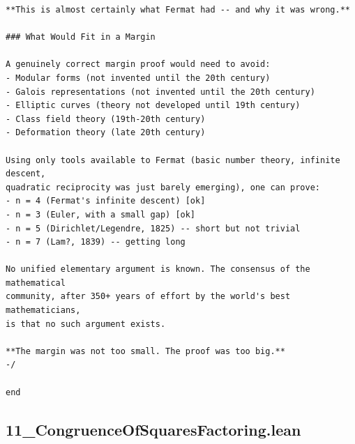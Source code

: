 \documentclass[11pt,openright,twoside]{book}
\theoremstyle{definition}
\begin{document}
\begin{lstlisting}[style=lean]
**This is almost certainly what Fermat had -- and why it was wrong.**

### What Would Fit in a Margin

A genuinely correct margin proof would need to avoid:
- Modular forms (not invented until the 20th century)
- Galois representations (not invented until the 20th century)
- Elliptic curves (theory not developed until 19th century)
- Class field theory (19th-20th century)
- Deformation theory (late 20th century)

Using only tools available to Fermat (basic number theory, infinite descent,
quadratic reciprocity was just barely emerging), one can prove:
- n = 4 (Fermat's infinite descent) [ok]
- n = 3 (Euler, with a small gap) [ok]
- n = 5 (Dirichlet/Legendre, 1825) -- short but not trivial
- n = 7 (Lam?, 1839) -- getting long

No unified elementary argument is known. The consensus of the mathematical
community, after 350+ years of effort by the world's best mathematicians,
is that no such argument exists.

**The margin was not too small. The proof was too big.**
-/

end
\end{lstlisting}

\clearpage


\subsection*{11\_CongruenceOfSquaresFactoring.lean}
\label{lean:11_CongruenceOfSquaresFactoring}
\end{document}
